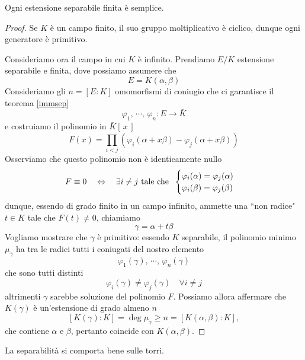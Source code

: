 \begin{multicols}{2}
\begin{theorem}\label{primitivo}
	Ogni estensione separabile finita è semplice.
\end{theorem}
\begin{proof}
	Se $ K $ è un campo finito, il suo gruppo moltiplicativo è ciclico, dunque ogni generatore è primitivo.
	
	Consideriamo ora il campo in cui $ K $ è infinito.
	Prendiamo $ E/K $ estensione separabile e finita, dove possiamo assumere che
	\[ E = K(\alpha, \beta) \]
	Consideriamo gli $ n = [E:K] $ omomorfismi di coniugio che ci garantisce il teorema \ref{immsep}
	\[ \varphi_1,\, \cdots,\, \varphi_n : E \to \bar{K}  \]
	e costruiamo il polinomio in $ \bar{K}[\,x\,] $
	\[ F(x) = \prod_{i < j}{\left(\varphi_i(\alpha + x \beta) - \varphi_j(\alpha + x \beta)\right)} \]
	Osserviamo che questo polinomio non è identicamente nullo
	\[ F \equiv 0 \quad\Leftrightarrow\quad \exists i \neq j \text{ tale che }\; \begin{cases}
	\varphi_i(\alpha) = \varphi_j(\alpha) \\
	\varphi_i(\beta) = \varphi_j(\beta)
	\end{cases} \]
	dunque, essendo di grado finito in un campo infinito, ammette una \textquotedblleft non radice" $ t \in K $ tale che
	$  F(t) \neq 0  $, chiamiamo 
	\[ \gamma = \alpha + t\beta \]
	Vogliamo mostrare che $ \gamma $ è primitivo: essendo $ K $ separabile, il polinomio minimo $ \mu_\gamma $ ha tra le radici tutti i coniugati del nostro elemento
	\[ \varphi_1{(\gamma)}, \, \cdots, \, \varphi_n{(\gamma)} \]
	che sono tutti distinti
	\[ \varphi_i(\gamma) \neq \varphi_j(\gamma) \quad\forall i \neq j \]
	altrimenti $ \gamma $ sarebbe soluzione del polinomio $ F $. Possiamo allora affermare che $ K(\gamma) $ è un'estensione di grado almeno $ n $
	\[ [K(\gamma):K] = \deg{\mu_\gamma} \geq n = [K(\alpha, \beta):K], \]
	che contiene $ \alpha $ e $ \beta $, pertanto coincide con $ K(\alpha, \beta) $.
\end{proof}

\begin{remark}
	La separabilità si comporta bene sulle torri. 
\end{remark}
\end{multicols}

